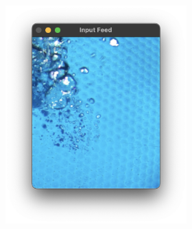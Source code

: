 \begin{figure}[H]
    \centering
    \begin{subfigure}{.6\textwidth}
        \begin{subfigure}{0.32\textwidth}
            \centering
            \includegraphics[width=1\linewidth]{assets/sys_input.png}
            \caption{}
            \label{fig:sys_input}
        \end{subfigure}
        \hfill
        \begin{subfigure}{0.32\textwidth}
            \centering

\end{subfigure}
\end{subfigure}
\end{figure}
